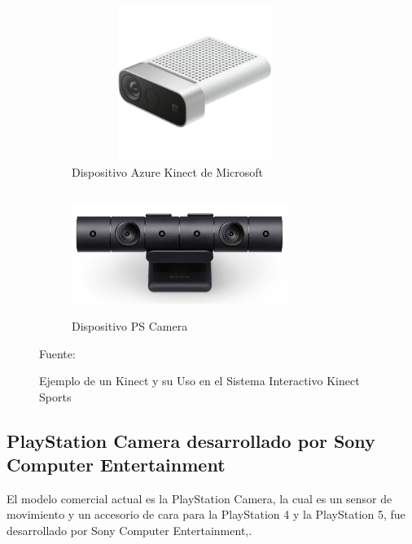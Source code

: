 \begin{figure}
	\centering
	\begin{subfigure}{.5\textwidth}
		\centering
		\includegraphics[width=8cm,height=5cm,]{./Images/azurekinect.png}
		\caption{Dispositivo Azure Kinect de Microsoft}
		\label{azureexample}
	\end{subfigure}%
	\begin{subfigure}{0.5\textwidth}
		\centering
		\includegraphics[width=7cm,height=4cm,]{./Images/cameraex.jpg}
		\caption{Dispositivo PS Camera}
		\label{cameraex}
	\end{subfigure}
	\caption{Ejemplo de un Kinect y su Uso en el Sistema Interactivo Kinect Sports}
	\footnotesize Fuente: \cite{cameraex} \cite{azurekinect}
	\label{AzureandCameraExample}
\end{figure}




\subsection{PlayStation Camera desarrollado por Sony Computer Entertainment}

El modelo comercial actual es la PlayStation Camera, la cual es un sensor de movimiento y un accesorio de cara para la PlayStation 4 y la PlayStation 5, fue desarrollado por Sony Computer Entertainment,.

